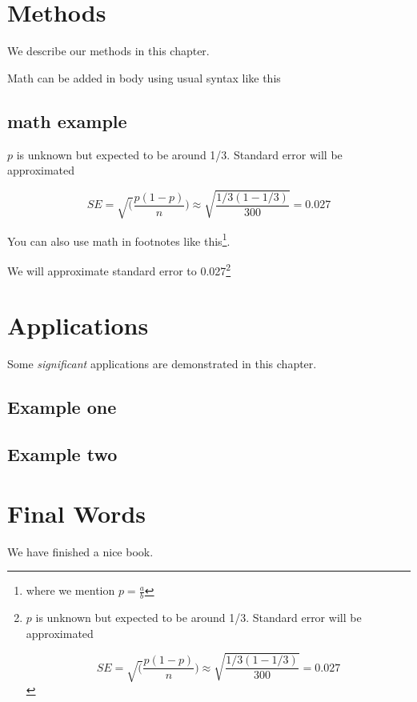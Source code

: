 \documentclass[
]{book}
\begin{document}
\hypertarget{methods}{%
\chapter{Methods}\label{methods}}

We describe our methods in this chapter.

Math can be added in body using usual syntax like this

\hypertarget{math-example}{%
\section{math example}\label{math-example}}

\(p\) is unknown but expected to be around 1/3. Standard error will be approximated

\[
SE = \sqrt(\frac{p(1-p)}{n}) \approx \sqrt{\frac{1/3 (1 - 1/3)} {300}} = 0.027
\]

You can also use math in footnotes like this\footnote{where we mention \(p = \frac{a}{b}\)}.

We will approximate standard error to 0.027\footnote{\(p\) is unknown but expected to be around 1/3. Standard error will be approximated

  \[
  SE = \sqrt(\frac{p(1-p)}{n}) \approx \sqrt{\frac{1/3 (1 - 1/3)} {300}} = 0.027
  \]}

\hypertarget{applications}{%
\chapter{Applications}\label{applications}}

Some \emph{significant} applications are demonstrated in this chapter.

\hypertarget{example-one}{%
\section{Example one}\label{example-one}}

\hypertarget{example-two}{%
\section{Example two}\label{example-two}}

\hypertarget{final-words}{%
\chapter{Final Words}\label{final-words}}

We have finished a nice book.

  
\end{document}
